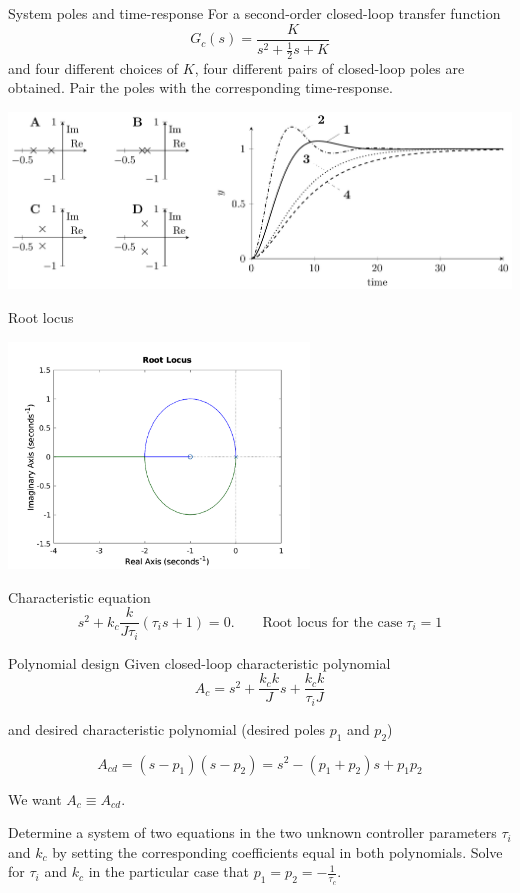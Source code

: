 \documentclass[dvisvgm,hypertex,aspectratio=169]{beamer}
\begin{document}
\begin{frame}[label=C4E]{System poles and time-response}
For a second-order closed-loop transfer function 
\[  G_c(s) = \frac{K}{s^2 + \frac{1}{2}s + K}\]
and four different choices of $K$, four different pairs of closed-loop poles are obtained.  Pair the poles with the corresponding time-response.
\begin{center}
  \includegraphics[width=0.77\linewidth]{cstr-control-step-beamer.png}
\end{center}
\end{frame}

\note{%
}

\begin{frame}[label=C5]{Root locus}
  \begin{center}
    \includegraphics[width=8cm]{rlocus-PI-integrator.png}\\
  \end{center}
  Characteristic equation
  \[ s^2 + k_c\frac{k}{J\tau_i}(\tau_is + 1)= 0. \qquad \text{Root locus for the case}\; \tau_i = 1\]

\end{frame}

\begin{frame}[label=C5E]{Polynomial design}
  Given closed-loop characteristic polynomial
  \[ A_{c} =  s^2 + \frac{k_c k}{J}s + \frac{k_c k}{\tau_i J}\]

  and desired characteristic polynomial (desired poles $p_1$ and $p_2$)

  \[ A_{cd}=(s-p_1)(s-p_2) = s^2 - (p_1+p_2)s + p_1p_2 \]

  We want \(A_c \equiv A_{cd}\).
  
  \alert{Determine} a system of two equations in the two unknown controller parameters $\tau_i$ and $k_c$ by setting the corresponding coefficients equal in both polynomials. \alert{Solve} for $\tau_i$ and $k_c$ in the particular case that \(p_1=p_2=-\frac{1}{\tau_c}\). 
  
\end{frame}
\end{document}
